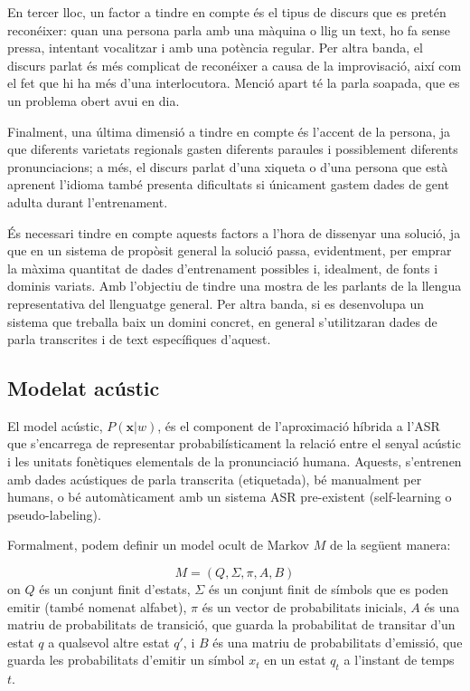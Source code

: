 En tercer lloc, un factor a tindre en compte és el tipus de discurs que es pretén reconéixer: quan una persona parla amb una màquina o llig un text, ho fa sense pressa, intentant vocalitzar i amb una potència regular. 
Per altra banda, el discurs parlat és més complicat de reconéixer a causa de la improvisació, així com el fet que hi ha més d'una interlocutora. Menció apart té la parla so\lgem apada, que es un problema obert avui en dia.

Finalment, una última dimensió a tindre en compte és l'accent de la persona, ja que diferents varietats regionals gasten diferents paraules i possiblement diferents pronunciacions; a més, el discurs parlat d'una xiqueta o d'una persona que està aprenent l'idioma també presenta dificultats si únicament gastem dades de gent adulta durant l'entrenament.

És necessari tindre en compte aquests factors a l'hora de dissenyar una solució, ja que en un sistema de propòsit general la solució passa, evidentment, per emprar la màxima quantitat de dades d'entrenament possibles i, idealment, de fonts i dominis variats. Amb l'objectiu de tindre una mostra de les parlants de la llengua representativa del llenguatge general. Per altra banda, si es desenvolupa un sistema que treballa baix un domini concret, en general s'utilitzaran dades de parla transcrites i de text específiques d'aquest.



\subsection{Modelat acústic}
\label{cap02_asr_am}

El model acústic, $P(\textbf{x}|w)$, és el component de l'aproximació híbrida a l'ASR que s'encarrega de representar probabilísticament la relació entre el senyal acústic i les unitats fonètiques elementals de la pronunciació humana. Aquests, s'entrenen amb dades acústiques de parla transcrita (etiquetada), bé manualment per humans, o bé automàticament amb un sistema ASR pre-existent (self-learning o pseudo-labeling).

Formalment, podem definir un model ocult de Markov $M$ de la següent manera:

\begin{equation}
M=(Q, \Sigma, \pi, A, B)
\end{equation}
on $Q$ és un conjunt finit d'estats, $\Sigma$ és un conjunt finit de símbols que es poden emitir (també nomenat alfabet), $\pi$ és un vector de probabilitats inicials, $A$ és una matriu de probabilitats de transició, que guarda la probabilitat de transitar d'un estat $q$ a qualsevol altre estat $q'$, i $B$ és una matriu de probabilitats d'emissió, que guarda les probabilitats d'emitir un símbol $x_t$ en un estat $q_t$ a l'instant de temps $t$.

